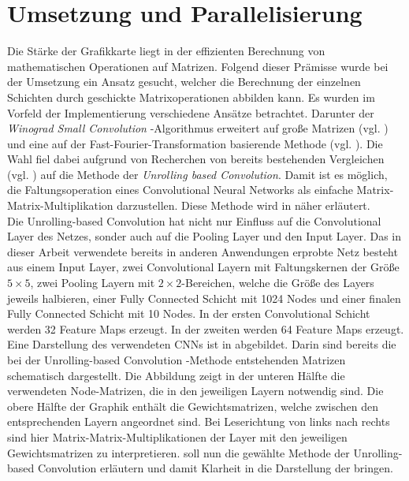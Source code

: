 \documentclass[../main.tex]{subfiles}
\begin{document}
\section{Umsetzung und Parallelisierung} \label{sec:cuda_umsetzung} 
Die Stärke der Grafikkarte liegt in der effizienten Berechnung von mathematischen Operationen auf Matrizen. Folgend dieser Prämisse wurde bei der Umsetzung ein Ansatz gesucht, welcher die Berechnung der einzelnen Schichten durch geschickte Matrixoperationen abbilden kann. Es wurden im Vorfeld der Implementierung verschiedene Ansätze betrachtet. Darunter der \emph{Winograd Small Convolution} -Algorithmus erweitert auf große Matrizen (vgl. \cite{WINOGRADSMALLCONV}) und eine auf der Fast-Fourier-Transformation basierende Methode (vgl. \cite{NVIDIA_WHITE_FFTCONV}). Die Wahl fiel dabei aufgrund von Recherchen von bereits bestehenden Vergleichen (vgl. \cite{UNROLLING_CONV}) auf die Methode der \emph{Unrolling based Convolution}. Damit ist es möglich, die Faltungsoperation eines Convolutional Neural Networks als einfache Matrix-Matrix-Multiplikation darzustellen. Diese Methode wird in  näher erläutert. \\ Die Unrolling-based Convolution hat nicht nur Einfluss auf die Convolutional Layer des Netzes, sonder auch auf die Pooling Layer und den Input Layer. Das in dieser Arbeit verwendete bereits in anderen Anwendungen erprobte Netz besteht aus einem Input Layer, zwei Convolutional Layern mit Faltungskernen der Größe $5\times 5$, zwei Pooling Layern mit $2\times 2$-Bereichen, welche die Größe des Layers jeweils halbieren, einer Fully Connected Schicht mit 1024 Nodes und einer finalen Fully Connected Schicht mit 10 Nodes. In der ersten Convolutional Schicht werden 32 Feature Maps erzeugt. In der zweiten werden 64 Feature Maps erzeugt. Eine Darstellung des verwendeten CNNs ist in  abgebildet. Darin sind bereits die bei der Unrolling-based Convolution -Methode entstehenden Matrizen schematisch dargestellt. Die Abbildung zeigt in der unteren Hälfte die verwendeten Node-Matrizen, die in den jeweiligen Layern notwendig sind. Die obere Hälfte der Graphik enthält die Gewichtsmatrizen, welche zwischen den entsprechenden Layern angeordnet sind. Bei Leserichtung von links nach rechts sind hier Matrix-Matrix-Multiplikationen der Layer mit den jeweiligen Gewichtsmatrizen zu interpretieren.  soll nun die gewählte Methode der Unrolling-based Convolution erläutern und damit Klarheit in die Darstellung der  bringen. \par 
\end{document}
